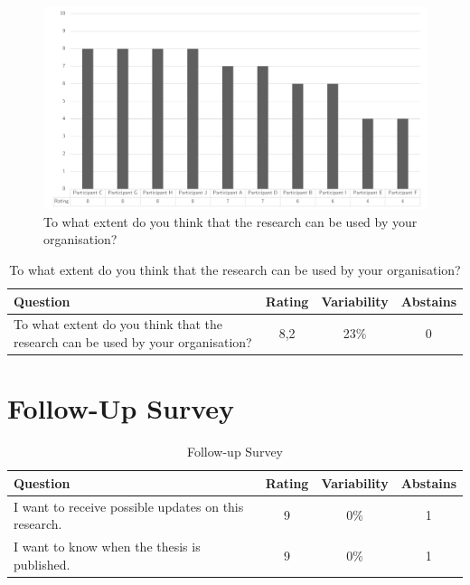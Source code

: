 \begin{figure}[H]
	\centering
	\includegraphics[width=0.9\linewidth]{images/validationresult_researchrelevanceorganisation}
	\caption[To what extent do you think that the research can be used by your organisation?]{To what extent do you think that the research can be used by your organisation?}
	\label{fig:validationrelevantorganisation}
\end{figure}
\begin{table}[H]
	\centering
	\begin{tabular}{p{}ccc}
		\toprule
		\textbf{Question} & \textbf{Rating} & \textbf{Variability} & \textbf{Abstains} \\
		\midrule
		To what extent do you think that the research can be used by your organisation? & 8,2 & 23\% & 0 \\%
		\bottomrule
	\end{tabular}%
	\caption[To what extent do you think that the research can be used by your organisation?]{To what extent do you think that the research can be used by your organisation?}
	\label{tab:validationrelevantorganisation}%
\end{table}%

\section{Follow-Up Survey}
\begin{table}[H]
	\centering
	\begin{tabular}{p{}ccc}
		\toprule
		\textbf{Question} & \textbf{Rating} & \textbf{Variability} & \textbf{Abstains} \\
		\midrule
		I want to receive possible updates on this research. & 9 & 0\% & 1 \\%
		I want to know when the thesis is published. & 9 & 0\% & 1 \\%
		\bottomrule
	\end{tabular}%
	\caption{Follow-up Survey}
	\label{tab:appfollowupsurvey}%
\end{table}%